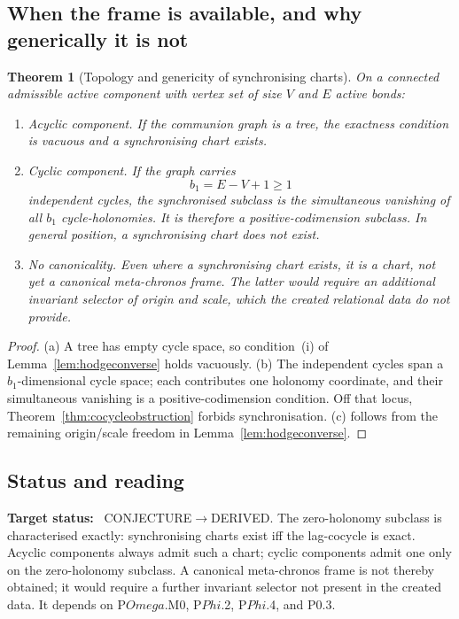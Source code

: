 \documentclass[11pt,a4paper]{article}
\def\Omega{Omega}%
\def\Phi{Phi}%
\def\emph#1{#1}%
\newcommand{\stDerived}{\textcolor{cDer}{\textsf{\small DERIVED}}}
\newcommand{\stConj}{\textcolor{cCon}{\textsf{\small CONJECTURE}}}
\theoremstyle{definition}
\theoremstyle{plain}
\newtheorem{theorem}[definition]{Theorem}
\theoremstyle{remark}
\begin{document}
\subsection{When the frame is available, and why generically it is not}

\begin{theorem}[Topology and genericity of synchronising charts]\label{thm:framegeneric}
On a connected admissible active component with vertex set of size \(V\) and
\(E\) active bonds:
\begin{enumerate}[label=\textup{(\alph*)},leftmargin=1.2cm]
\item \emph{Acyclic component.} If the communion graph is a tree, the exactness
condition is vacuous and a synchronising chart exists.

\item \emph{Cyclic component.} If the graph carries
\[
b_1=E-V+1\ge1
\]
independent cycles, the synchronised subclass is the simultaneous vanishing of all
\(b_1\) cycle-holonomies. It is therefore a positive-codimension subclass. In
general position, a synchronising chart does not exist.

\item \emph{No canonicality.} Even where a synchronising chart exists, it is a
chart, not yet a canonical meta-chronos frame. The latter would require an
additional invariant selector of origin and scale, which the created relational
data do not provide.
\end{enumerate}
\end{theorem}

\begin{proof}
(a) A tree has empty cycle space, so condition~(i) of
Lemma~\ref{lem:hodgeconverse} holds vacuously. (b) The independent cycles span a
\(b_1\)-dimensional cycle space; each contributes one holonomy coordinate, and
their simultaneous vanishing is a positive-codimension condition. Off that locus,
Theorem~\ref{thm:cocycleobstruction} forbids synchronisation. (c) follows from the
remaining origin/scale freedom in Lemma~\ref{lem:hodgeconverse}. \qedhere
\end{proof}

\subsection{Status and reading}

\textbf{Target status:}~
\stConj\(\to\)\stDerived. The zero-holonomy subclass is characterised exactly:
synchronising charts exist iff the lag-cocycle is exact. Acyclic components always
admit such a chart; cyclic components admit one only on the zero-holonomy
subclass. A canonical meta-chronos frame is not thereby obtained; it would require
a further invariant selector not present in the created data. It depends on
P\(\Omega\).M0, P\(\Phi\).2, P\(\Phi\).4, and P0.3.
\end{document}

